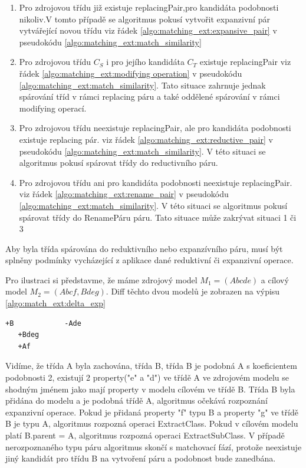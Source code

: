 \documentclass[11pt,twoside,a4paper]{book}
\begin{document}
\begin{enumerate}
  \item Pro zdrojovou třídu již existuje replacingPair,pro kandidáta podobnosti
     nikoliv.V tomto případě se algoritmus pokusí vytvořit expanzivní pár
     vytvářející novou třídu viz řádek \ref{algo:matching_ext:expansive_pair}
     v pseudokódu \ref{algo:matching_ext:match_similarity}
  \item Pro zdrojovou třídu $C_S$ i pro jejího kandidáta $C_T$ existuje
     replacingPair viz řádek \ref{algo:matching_ext:modifying operation}
     v pseudokódu \ref{algo:matching_ext:match_similarity}. Tato situace
     zahrnuje jednak spárování tříd v rámci replacing páru a také oddělené
     spárování v rámci modifying operací.
  \item Pro zdrojovou třídu neexistuje replacingPair, ale pro kandidáta
     podobnosti existuje replacing pár. viz řádek
     \ref{algo:matching_ext:reductive_pair} v pseudokódu
     \ref{algo:matching_ext:match_similarity}. V této situaci se algoritmus
     pokusí spárovat třídy do reductivního páru. 
  \item Pro zdrojovou třídu ani pro kandidáta podobnosti neexistuje
     replacingPair. viz řádek \ref{algo:matching_ext:rename_pair} v
     pseudokódu \ref{algo:matching_ext:match_similarity}. V této situaci se algoritmus
     pokusí spárovat třídy do RenamePáru páru. Tato situace může zakrývat
     situaci 1 či 3
\end{enumerate}

Aby byla třída spárována do reduktivního nebo expanzívního páru, musí být
splněny podmínky vycházející z aplikace dané reduktivní či expanzivní operace.

 Pro ilustraci si představme, že máme zdrojový model $M_1 = (Abcde)$ a cílový
 model $M_2 = (Abcf, Bdeg)$. Diff těchto dvou modelů je zobrazen na výpisu
 \ref{algo:match_ext:delta_exp}

 \begin{lstlisting}[frame=single,caption=Textový diff pro
 expanzivní operaci,label=algo:match_ext:delta_exp]
   +B            -Ade
   +Bdeg          
   +Af
\end{lstlisting}
 
 Vidíme, že třída A byla zachována, třída B, třída B je podobná A s koeficientem
 podobnosti 2, existují 2 property("e" a "d") ve třídě A ve zdrojovém modelu se
 shodným jménem jako mají property v modelu cílovém ve třídě B. Třída B byla
 přidána do modelu a je podobná třídě A, algoritmus očekává rozpoznání
 expanzivní operace. Pokud je přidaná property "f" typu B a property "g" ve
 třídě B je typu A, algoritmus rozpozná operaci ExtractClass. Pokud v
 cílovém modelu platí B.parent = A, algoritmus rozpozná operaci ExtractSubClass.
 V případě nerozpoznaného typu páru algoritmus skončí s matchovací fází, protože
 neexistuje jiný kandidát pro třídu B na vytvoření páru a podobnost bude
 zanedbána.\\
 
\end{document}

